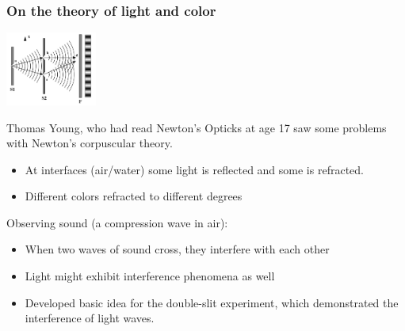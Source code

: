 \documentclass{beamer}
\begin{document}
\begin{frame}\frametitle{On the theory of light and color}

\begin{center}
\includegraphics[width=3cm]{fig/youngDoubleSlit.jpg}
\end{center}

Thomas Young, who had read Newton’s Opticks at age 17 saw some problems with Newton’s corpuscular theory.
\begin{itemize}
\item At interfaces (air/water) some light is reflected and some is refracted.
\item Different colors refracted to different degrees
\end{itemize} 

Observing sound (a compression wave in air):
\begin{itemize}
\item When two waves of sound cross, they interfere with each other
\item Light might exhibit interference phenomena as well
\item Developed basic idea for the double-slit experiment, which demonstrated the interference of light waves.
\end{itemize}
\end{frame}
\end{document}
